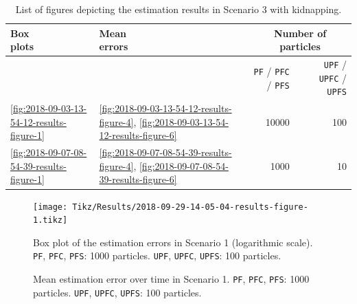 \begin{table}[h!]
\centering
{}\begin{tabular}{@{}llrrrr@{}}
\toprule
\thead{\normalsize Box \\ \normalsize plots} & \thead{\normalsize Mean \\ \normalsize errors} & \phantom{a} & \multicolumn{3}{c}{Number of particles} \\
\midrule
& & & \texttt{PF} / \texttt{PFC} / \texttt{PFS} & \phantom{a} & \texttt{UPF} / \texttt{UPFC} / \texttt{UPFS} \\
\cmidrule{4-4} \cmidrule{6-6}
\ref{fig:2018-09-03-13-54-12-results-figure-1} & \ref{fig:2018-09-03-13-54-12-results-figure-4}, \ref{fig:2018-09-03-13-54-12-results-figure-6} & & 10000 & & 100 \\ 
\ref{fig:2018-09-07-08-54-39-results-figure-1} & \ref{fig:2018-09-07-08-54-39-results-figure-4}, \ref{fig:2018-09-07-08-54-39-results-figure-6} & & 1000 & & 10 \\ 
\bottomrule
\end{tabular}
\caption{List of figures depicting the estimation results in Scenario 3 with kidnapping.}
\label{tab:results_scenario3_kidnapping}
\end{table}





\begin{figure}
	\centering
	\setlength\figureheight{0.9\textheight} 	
	\setlength{}		
	\texttt{[image: Tikz/Results/2018-09-29-14-05-04-results-figure-1.tikz]}			
	\caption[Box plot of the estimation errors in Scenario 1. \texttt{PF}, \texttt{PFC}, \texttt{PFS}: 1000 particles. \texttt{UPF}, \texttt{UPFC}, \texttt{UPFS}: 100 particles.]{Box plot of the estimation errors in Scenario 1 (logarithmic scale). \texttt{PF}, \texttt{PFC}, \texttt{PFS}: 1000 particles. \texttt{UPF}, \texttt{UPFC}, \texttt{UPFS}: 100 particles.}
	\label{fig:2018-09-29-14-05-04-results-figure-1}			
\end{figure}

\begin{figure}
	\centering
	\setlength{} 	
	\setlength\figurewidth{0.9\textheight}		
	\caption[Mean estimation error over time in Scenario 1. \texttt{PF}, \texttt{PFC}, \texttt{PFS}: 1000 particles. \texttt{UPF}, \texttt{UPFC}, \texttt{UPFS}: 100 particles.]{Mean estimation error over time in Scenario 1. \texttt{PF}, \texttt{PFC}, \texttt{PFS}: 1000 particles. \texttt{UPF}, \texttt{UPFC}, \texttt{UPFS}: 100 particles.}
	\label{fig:2018-09-29-14-05-04-results-figure-5}			
\end{figure}

